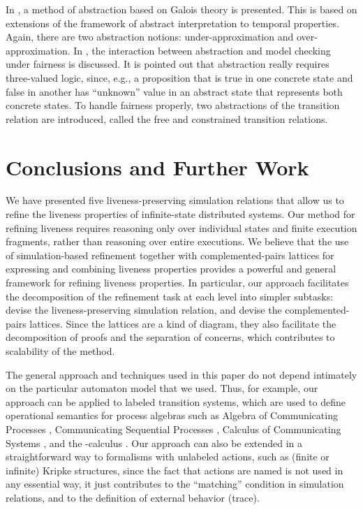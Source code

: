 \documentclass[11pt]{article}
\begin{document}
In \cite{Ur98}, a method of abstraction based on Galois theory is presented. 
This is based on extensions of the framework of abstract
interpretation \cite{CC77} to temporal properties. 
Again, there are two abstraction notions: under-approximation and
over-approximation.
In \cite{DGG00}, the interaction between abstraction and model
checking under fairness is discussed.  
It is pointed out that abstraction really requires three-valued logic,
since, e.g., a proposition that is true in one concrete state and
false in another has ``unknown'' value in an abstract state
that represents both concrete states.
To handle fairness properly, two abstractions of the transition
relation are introduced, called the free and constrained transition
relations. 



\section{Conclusions and Further Work}
\label{sec:conc}

We have presented five liveness-preserving simulation relations that
allow us to refine the liveness properties of infinite-state
distributed systems.
Our method for refining liveness requires reasoning only over
individual states and finite execution fragments, rather than
reasoning over entire executions.  We believe that the use of
simulation-based refinement together with complemented-pairs lattices
for expressing and combining liveness properties provides a
powerful and general framework for refining liveness properties.
In particular, our approach facilitates the decomposition of the
refinement task at each level into simpler subtasks: devise the
liveness-preserving simulation relation, and devise the
complemented-pairs lattices. Since the lattices are a kind of diagram,
they also facilitate the decomposition of proofs and the separation of
concerns, which contributes to scalability of the method.

The general approach and techniques used in this paper do not depend
intimately on the particular automaton model that we used.  Thus, for
example, our approach can be applied to labeled transition systems,
which are used to define operational semantics for process algebras
such as Algebra of Communicating Processes \cite{BW90},
Communicating Sequential Processes \cite{Hoa85},
Calculus of Communicating Systems \cite{Mil89}, and the -calculus \cite{Mil99}.
Our approach can also be extended in a
straightforward way to formalisms with unlabeled actions, such as
(finite or infinite) Kripke structures, 
since the fact that actions are named is not used in any essential
way, it just contributes to the ``matching'' condition in simulation
relations, and to the definition of external behavior (trace).
\end{document}
